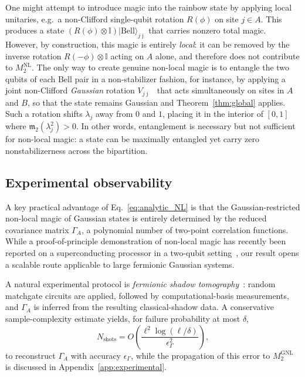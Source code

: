 \documentclass[prx,twocolumn,superscriptaddress,aps,10pt, frontmatterverbose, reprint,footinbib,longbibliography=true]{revtex4-2}
\begin{document}
One might attempt to introduce magic into the rainbow state by applying local unitaries, e.g.\ a non-Clifford single-qubit rotation $R(\phi)$ on site $j\in A$. This produces a state $(R(\phi)\otimes \mathbb{I})|\mathrm{Bell}\rangle_{j\bar\jmath}$ that carries nonzero total magic. However, by construction, this magic is entirely \emph{local}: it can be removed by the inverse rotation $R(-\phi)\otimes \mathbb{I}$ acting on $A$ alone, and therefore does not contribute to $M_2^{\mathrm{NL}}$. The only way to create genuine non-local magic is to entangle the two qubits of each Bell pair in a non-stabilizer fashion, for instance, by applying a joint non-Clifford \emph{Gaussian} rotation $V_{j\bar\jmath}$~\cite{huang2026dismagickerunitarygatenonstabilizerness} that acts simultaneously on sites in $A$ and $B$, so that the state remains Gaussian and Theorem~\ref{thm:global} applies. Such a rotation shifts $\lambda_j$ away from $0$ and $1$, placing it in the interior of $[0,1]$ where $\mathfrak{m}_2(\lambda_j^2) > 0$. In other words, entanglement is necessary but not sufficient for non-local magic: a state can be maximally entangled yet carry zero nonstabilizerness across the bipartition.


\subsection{Experimental observability}
A key practical advantage of Eq.~\eqref{eq:analytic_NL} is that the Gaussian-restricted non-local magic of Gaussian states is entirely determined by the reduced covariance matrix $\Gamma_A$, a polynomial number of two-point correlation functions.
While a proof-of-principle demonstration of non-local magic has recently been reported on a superconducting processor in a two-qubit setting~\cite{ahmad2025experimentaldemonstrationnonlocalmagic}, our result opens a scalable route applicable to large fermionic Gaussian systems.

A natural experimental protocol is \emph{fermionic shadow tomography}~\cite{Wan_2023}: random matchgate circuits are applied, followed by computational-basis measurements, and $\Gamma_A$ is inferred from the resulting classical-shadow data.
A conservative sample-complexity estimate yields, for failure probability at most $\delta$,
\[
N_{\mathrm{shots}} = O\!\left(\frac{\ell^2 \log(\ell/\delta)}{\epsilon_\Gamma^2}\right),
\]
to reconstruct \(\Gamma_A\) with accuracy \(\epsilon_\Gamma\), while the propagation of this error  to \(M_2^{\mathrm{GNL}}\) is discussed in  Appendix~\ref{app:experimental}.
\end{document}
